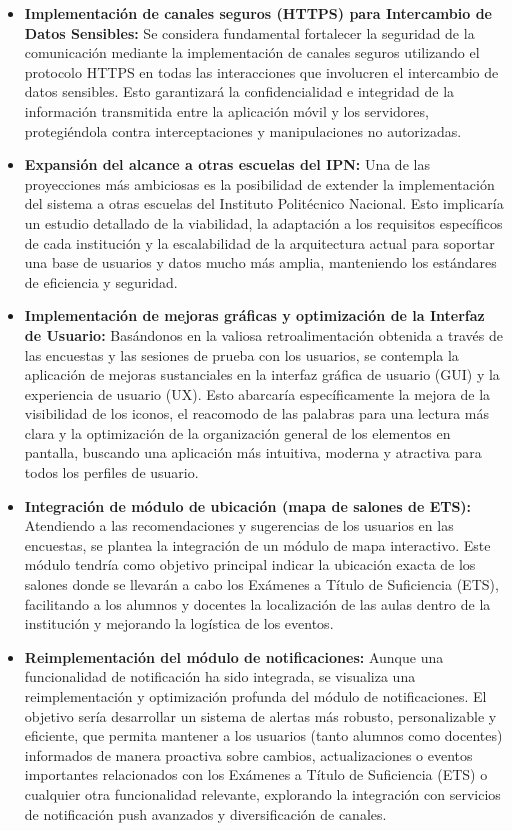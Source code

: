 \begin{itemize}
	\item \textbf{Implementación de canales seguros (HTTPS) para Intercambio de Datos Sensibles:} Se considera fundamental fortalecer la seguridad de la comunicación mediante la implementación de canales seguros utilizando el protocolo HTTPS en todas las interacciones que involucren el intercambio de datos sensibles. Esto garantizará la confidencialidad e integridad de la información transmitida entre la aplicación móvil y los servidores, protegiéndola contra interceptaciones y manipulaciones no autorizadas.
	
	\item \textbf{Expansión del alcance a otras escuelas del IPN:} Una de las proyecciones más ambiciosas es la posibilidad de extender la implementación del sistema a otras escuelas del Instituto Politécnico Nacional. Esto implicaría un estudio detallado de la viabilidad, la adaptación a los requisitos específicos de cada institución y la escalabilidad de la arquitectura actual para soportar una base de usuarios y datos mucho más amplia, manteniendo los estándares de eficiencia y seguridad.
	
	\item \textbf{Implementación de mejoras gráficas y optimización de la Interfaz de Usuario:} Basándonos en la valiosa retroalimentación obtenida a través de las encuestas y las sesiones de prueba con los usuarios, se contempla la aplicación de mejoras sustanciales en la interfaz gráfica de usuario (GUI) y la experiencia de usuario (UX). Esto abarcaría específicamente la mejora de la visibilidad de los iconos, el reacomodo de las palabras para una lectura más clara y la optimización de la organización general de los elementos en pantalla, buscando una aplicación más intuitiva, moderna y atractiva para todos los perfiles de usuario.
	
	\item \textbf{Integración de módulo de ubicación (mapa de salones de ETS):} Atendiendo a las recomendaciones y sugerencias de los usuarios en las encuestas, se plantea la integración de un módulo de mapa interactivo. Este módulo tendría como objetivo principal indicar la ubicación exacta de los salones donde se llevarán a cabo los Exámenes a Título de Suficiencia (ETS), facilitando a los alumnos y docentes la localización de las aulas dentro de la institución y mejorando la logística de los eventos.
	
	\item \textbf{Reimplementación del módulo de notificaciones:} Aunque una funcionalidad de notificación ha sido integrada, se visualiza una reimplementación y optimización profunda del módulo de notificaciones. El objetivo sería desarrollar un sistema de alertas más robusto, personalizable y eficiente, que permita mantener a los usuarios (tanto alumnos como docentes) informados de manera proactiva sobre cambios, actualizaciones o eventos importantes relacionados con los Exámenes a Título de Suficiencia (ETS) o cualquier otra funcionalidad relevante, explorando la integración con servicios de notificación push avanzados y diversificación de canales.
	

\end{itemize}
